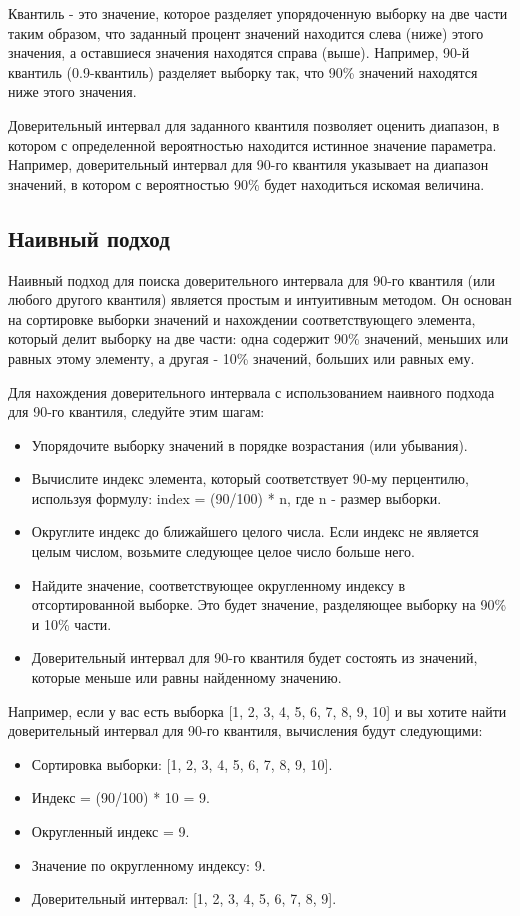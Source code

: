 \documentclass[specialist,
               substylefile = spbu_report.rtx,
               subf,href,colorlinks=true, 12pt]{disser}
\begin{document}
Квантиль - это значение, которое разделяет упорядоченную выборку на две части таким образом, что заданный процент значений находится слева (ниже) этого значения, а оставшиеся значения находятся справа (выше). Например, 90-й квантиль (0.9-квантиль) разделяет выборку так, что 90\% значений находятся ниже этого значения.

Доверительный интервал для заданного квантиля позволяет оценить диапазон, в котором с определенной вероятностью находится истинное значение параметра. Например, доверительный интервал для 90-го квантиля указывает на диапазон значений, в котором с вероятностью 90\% будет находиться искомая величина.

\subsection{Наивный подход}

Наивный подход для поиска доверительного интервала для 90-го квантиля (или любого другого квантиля) является простым и интуитивным методом. Он основан на сортировке выборки значений и нахождении соответствующего элемента, который делит выборку на две части: одна содержит 90\% значений, меньших или равных этому элементу, а другая - 10\% значений, больших или равных ему.

Для нахождения доверительного интервала с использованием наивного подхода для 90-го квантиля, следуйте этим шагам:
    \begin{itemize}
        \item Упорядочите выборку значений в порядке возрастания (или убывания).
		\item Вычислите индекс элемента, который соответствует 90-му перцентилю, используя формулу: index = (90/100) * n, где n - размер выборки.
		\item Округлите индекс до ближайшего целого числа. Если индекс не является целым числом, возьмите следующее целое число больше него.
		\item Найдите значение, соответствующее округленному индексу в отсортированной выборке. Это будет значение, разделяющее выборку на 90\% и 10\% части.
		\item Доверительный интервал для 90-го квантиля будет состоять из значений, которые меньше или равны найденному значению.
    \end{itemize}
		
Например, если у вас есть выборка [1, 2, 3, 4, 5, 6, 7, 8, 9, 10] и вы хотите найти доверительный интервал для 90-го квантиля, вычисления будут следующими:
	\begin{itemize}	
        \item Сортировка выборки: [1, 2, 3, 4, 5, 6, 7, 8, 9, 10].
		\item Индекс = (90/100) * 10 = 9.
		\item Округленный индекс = 9.
		\item  Значение по округленному индексу: 9.
		\item Доверительный интервал: [1, 2, 3, 4, 5, 6, 7, 8, 9].
    \end{itemize}
        	
\end{document}
